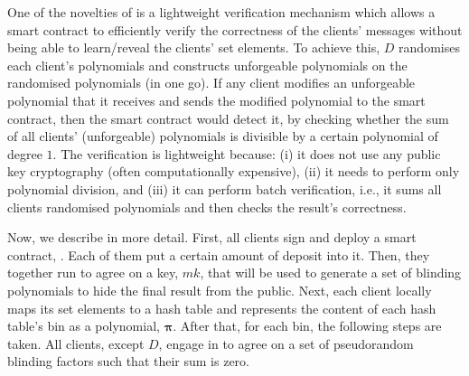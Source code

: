 One of the novelties of \fpsi is a lightweight verification mechanism which allows a smart contract to efficiently verify the correctness of the clients' messages without being able to learn/reveal the clients' set elements. To achieve this, $D$ randomises each client's polynomials and constructs unforgeable polynomials on the randomised polynomials (in one go). If any client modifies an unforgeable polynomial that it receives and sends the modified polynomial to the smart contract,  then the smart contract would detect it, by checking whether the sum of all clients' (unforgeable) polynomials is divisible by a certain polynomial of degree $1$.  The verification is lightweight because: (i) it does not use any public key cryptography (often computationally expensive), (ii) it needs to perform only polynomial division, and (iii) it can perform batch verification, i.e., it sums all clients randomised polynomials and then checks the result's correctness.






%


%
%


Now, we describe \fpsi in more detail. First, all clients sign and deploy a  smart contract, \scf. Each of them put a certain amount of deposit into it. Then, they together run \ct to agree on a key, $mk$, that will be used to generate a set of blinding polynomials to hide the final result from the public. Next, each client locally maps its set elements to a hash table and represents the content of each hash table's bin as a polynomial, $\bm\pi$. After that, for each bin, the following steps are taken.  All clients, except $D$, engage in \zspaa to agree on a set of pseudorandom blinding factors such that their sum is zero.  %

